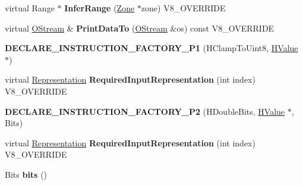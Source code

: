 \begin{DoxyCompactItemize}
\item 
\hypertarget{classv8_1_1internal_1_1_v8___f_i_n_a_l_a7d7c752019e44fc1ba3895619da6a7f5}{}virtual Range $\ast$ {\bfseries Infer\+Range} (\hyperlink{classv8_1_1internal_1_1_zone}{Zone} $\ast$zone) V8\+\_\+\+O\+V\+E\+R\+R\+I\+D\+E\label{classv8_1_1internal_1_1_v8___f_i_n_a_l_a7d7c752019e44fc1ba3895619da6a7f5}

\item 
\hypertarget{classv8_1_1internal_1_1_v8___f_i_n_a_l_ac450dad970b14246be761ccf5004924b}{}virtual \hyperlink{classv8_1_1internal_1_1_o_stream}{O\+Stream} \& {\bfseries Print\+Data\+To} (\hyperlink{classv8_1_1internal_1_1_o_stream}{O\+Stream} \&os) const V8\+\_\+\+O\+V\+E\+R\+R\+I\+D\+E\label{classv8_1_1internal_1_1_v8___f_i_n_a_l_ac450dad970b14246be761ccf5004924b}

\item 
\hypertarget{classv8_1_1internal_1_1_v8___f_i_n_a_l_aa9308f6debf740b9e9f0c1eb18ba53f8}{}{\bfseries D\+E\+C\+L\+A\+R\+E\+\_\+\+I\+N\+S\+T\+R\+U\+C\+T\+I\+O\+N\+\_\+\+F\+A\+C\+T\+O\+R\+Y\+\_\+\+P1} (H\+Clamp\+To\+Uint8, \hyperlink{classv8_1_1internal_1_1_h_value}{H\+Value} $\ast$)\label{classv8_1_1internal_1_1_v8___f_i_n_a_l_aa9308f6debf740b9e9f0c1eb18ba53f8}

\item 
\hypertarget{classv8_1_1internal_1_1_v8___f_i_n_a_l_a6c6d1f37f40b113d8f4062f1ffff7215}{}virtual \hyperlink{classv8_1_1internal_1_1_representation}{Representation} {\bfseries Required\+Input\+Representation} (int index) V8\+\_\+\+O\+V\+E\+R\+R\+I\+D\+E\label{classv8_1_1internal_1_1_v8___f_i_n_a_l_a6c6d1f37f40b113d8f4062f1ffff7215}

\item 
\hypertarget{classv8_1_1internal_1_1_v8___f_i_n_a_l_a75a2974ac31a2bf43fbcc8322b783eba}{}{\bfseries D\+E\+C\+L\+A\+R\+E\+\_\+\+I\+N\+S\+T\+R\+U\+C\+T\+I\+O\+N\+\_\+\+F\+A\+C\+T\+O\+R\+Y\+\_\+\+P2} (H\+Double\+Bits, \hyperlink{classv8_1_1internal_1_1_h_value}{H\+Value} $\ast$, Bits)\label{classv8_1_1internal_1_1_v8___f_i_n_a_l_a75a2974ac31a2bf43fbcc8322b783eba}

\item 
\hypertarget{classv8_1_1internal_1_1_v8___f_i_n_a_l_a6c6d1f37f40b113d8f4062f1ffff7215}{}virtual \hyperlink{classv8_1_1internal_1_1_representation}{Representation} {\bfseries Required\+Input\+Representation} (int index) V8\+\_\+\+O\+V\+E\+R\+R\+I\+D\+E\label{classv8_1_1internal_1_1_v8___f_i_n_a_l_a6c6d1f37f40b113d8f4062f1ffff7215}

\item 
\hypertarget{classv8_1_1internal_1_1_v8___f_i_n_a_l_a87752ed10c06c00be6809e4d36909e5d}{}Bits {\bfseries bits} ()\label{classv8_1_1internal_1_1_v8___f_i_n_a_l_a87752ed10c06c00be6809e4d36909e5d}


\end{DoxyCompactItemize}
